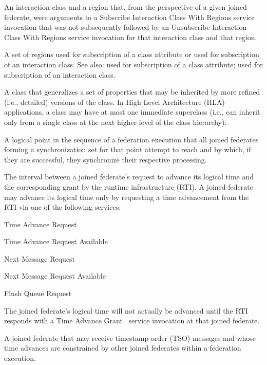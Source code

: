  An interaction class and a region that, from the perspective of a given joined federate, were arguments to a Subscribe Interaction Class With Regions service invocation that was not subsequently followed by an Unsubscribe Interaction Class With Regions service invocation for that interaction class and that region.

 A set of regions used for subscription of a class attribute or used for subscription of an interaction class. See also: used for subscription of a class attribute; used for subscription of an interaction class.

 A class that generalizes a set of properties that may be inherited by more refined (i.e., detailed) versions of the class. In High Level Architecture (HLA) applications, a class may have at most one immediate superclass (i.e., can inherit only from a single class at the next higher level of the class hierarchy).

 A logical point in the sequence of a federation execution that all joined federates forming a synchronization set for that point attempt to reach and by which, if they are successful, they synchronize their respective processing.

 The interval between a joined federate's request to advance its logical time and the corresponding grant by the runtime infrastructure (RTI). A joined federate may advance its logical time only by requesting a time advancement from the RTI via one of the following services:
\begin{stdalphalist}
    \item Time Advance Request
    \item Time Advance Request Available
    \item Next Message Request
    \item Next Message Request Available
    \item Flush Queue Request
\end{stdalphalist}
The joined federate's logical time will not actually be advanced until the RTI responds with a Time Advance Grant \rtiinitiated\ service invocation at that joined federate.

 A joined federate that may receive timestamp order (TSO) messages and whose time advances are constrained by other joined federates within a federation execution.


